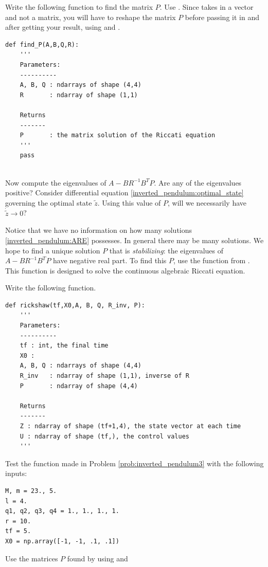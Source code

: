 \begin{problem}
Write the following function to find the matrix $P$. 
Use . 
Since  takes in a vector and not a matrix, you will have to reshape the matrix $P$ before passing it in and after getting your result, using  and .
\begin{lstlisting}
def find_P(A,B,Q,R):
	'''
	Parameters:
	----------
	A, B, Q : ndarrays of shape (4,4)
	R		: ndarray of shape (1,1)
	
	Returns
	-------
	P		: the matrix solution of the Riccati equation
	'''
	pass


\end{lstlisting}
Now compute the eigenvalues of $A - BR^{-1}B^TP$. Are any of the eigenvalues positive? 
Consider differential equation \eqref{inverted_pendulum:optimal_state} governing the optimal state $\tilde{z}$. 
Using this value of $P$, will we necessarily have $\dot{\tilde{z}} \to 0$?
\end{problem}


Notice that we have no information on how many solutions \eqref{inverted_pendulum:ARE} possesses. 
In general there may be many solutions. 
We hope to find a unique solution $P$ that is \textit{stabilizing}: the eigenvalues of $A - BR^{-1}B^TP$ have negative real part. To find this $P$, use the function  from . This function is designed to solve the continuous algebraic Riccati equation. 

\begin{problem}
	Write the following function.
\begin{lstlisting}
def rickshaw(tf,X0,A, B, Q, R_inv, P):
	'''
	Parameters:
	----------
	tf : int, the final time
	X0 : 
	A, B, Q	: ndarrays of shape (4,4)
	R_inv	: ndarray of shape (1,1), inverse of R
	P		: ndarray of shape (4,4)
	
	Returns
	-------
	Z : ndarray of shape (tf+1,4), the state vector at each time
	U : ndarray of shape (tf,), the control values
	'''
\end{lstlisting}
\label{prob:inverted_pendulum3}
\end{problem}

\begin{problem}
Test the function made in Problem \eqref{prob:inverted_pendulum3} with the following inputs: 
\begin{lstlisting}
M, m = 23., 5.
l = 4.
q1, q2, q3, q4 = 1., 1., 1., 1.
r = 10.
tf = 5.
X0 = np.array([-1, -1, .1, .1])
\end{lstlisting}
Use the matrices $P$ found by using  and  

\end{problem}



